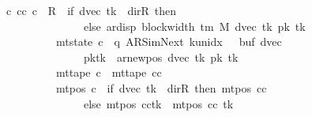 \begin{isabellebody}
\ \ \ \ \ \ \ \ \ \ \ {\isasymLongrightarrow}\ {\isasymexists}c{\isacharprime}{\kern0pt}{\isachardot}{\kern0pt}\ {\isacharparenleft}{\kern0pt}cc{\isacharcomma}{\kern0pt}\ c{\isacharprime}{\kern0pt}{\isacharparenright}{\kern0pt}\ {\isasymin}\ R{\isacharprime}{\kern0pt}\ {\isacharcircum}{\kern0pt}{\isacharcircum}{\kern0pt}\ {\isacharparenleft}{\kern0pt}if\ dvec\ tk{\isacharprime}{\kern0pt}\ {\isacharequal}{\kern0pt}\ dir{\isachardot}{\kern0pt}R\ then\ {}\isanewline
\ \ \ \ \ \ \ \ \ \ \ \ \ \ \ \ \ \ \ \ \ \ \ \ \ \ else\ ar{\isacharunderscore}{\kern0pt}disp\ {\isacharparenleft}{\kern0pt}block{\isacharunderscore}{\kern0pt}width\ {\isacharparenleft}{\kern0pt}{\isasymGamma}{\isacharunderscore}{\kern0pt}tm\ M{\isacharparenright}{\kern0pt}{\isacharparenright}{\kern0pt}\ {\isacharparenleft}{\kern0pt}dvec\ tk{\isacharprime}{\kern0pt}{\isacharparenright}{\kern0pt}\ {\isacharparenleft}{\kern0pt}pk{\isacharprime}{\kern0pt}\ tk{\isacharprime}{\kern0pt}{\isacharparenright}{\kern0pt}{\isacharparenright}{\kern0pt}\isanewline
\ \ \ \ \ \ \ \ \ \ \ \ \ \ \ \ \ \ \ \ {\isasymand}\ mt{\isacharunderscore}{\kern0pt}state\ c{\isacharprime}{\kern0pt}\ {\isacharequal}{\kern0pt}\ {\isacharparenleft}{\kern0pt}q{\isacharcomma}{\kern0pt}\ AR{\isacharunderscore}{\kern0pt}SimNext{\isacharcomma}{\kern0pt}\ k{\isacharunderscore}{\kern0pt}unidx\ {}{\isacharcomma}{\kern0pt}\ {}{\isacharcomma}{\kern0pt}\ buf{}{\isacharcomma}{\kern0pt}\ dvec{\isacharcomma}{\kern0pt}\isanewline
\ \ \ \ \ \ \ \ \ \ \ \ \ \ \ \ \ \ \ \ \ \ \ \ \ \ pk{\isacharprime}{\kern0pt}{\isacharparenleft}{\kern0pt}tk{\isacharprime}{\kern0pt}\ {\isacharcolon}{\kern0pt}{\isacharequal}{\kern0pt}\ ar{\isacharunderscore}{\kern0pt}newpos\ {\isacharparenleft}{\kern0pt}dvec\ tk{\isacharprime}{\kern0pt}{\isacharparenright}{\kern0pt}\ {\isacharparenleft}{\kern0pt}pk{\isacharprime}{\kern0pt}\ tk{\isacharprime}{\kern0pt}{\isacharparenright}{\kern0pt}{\isacharparenright}{\kern0pt}{\isacharparenright}{\kern0pt}\isanewline
\ \ \ \ \ \ \ \ \ \ \ \ \ \ \ \ \ \ \ \ {\isasymand}\ mt{\isacharunderscore}{\kern0pt}tape\ c{\isacharprime}{\kern0pt}\ {\isacharequal}{\kern0pt}\ mt{\isacharunderscore}{\kern0pt}tape\ cc\isanewline
\ \ \ \ \ \ \ \ \ \ \ \ \ \ \ \ \ \ \ \ {\isasymand}\ mt{\isacharunderscore}{\kern0pt}pos\ c{\isacharprime}{\kern0pt}\ {\isacharequal}{\kern0pt}\ {\isacharparenleft}{\kern0pt}if\ dvec\ tk{\isacharprime}{\kern0pt}\ {\isacharequal}{\kern0pt}\ dir{\isachardot}{\kern0pt}R\ then\ mt{\isacharunderscore}{\kern0pt}pos\ cc\isanewline
\ \ \ \ \ \ \ \ \ \ \ \ \ \ \ \ \ \ \ \ \ \ \ \ \ \ else\ {\isacharparenleft}{\kern0pt}mt{\isacharunderscore}{\kern0pt}pos\ cc{\isacharparenright}{\kern0pt}{\isacharparenleft}{\kern0pt}tk{\isacharprime}{\kern0pt}\ {\isacharcolon}{\kern0pt}{\isacharequal}{\kern0pt}\ mt{\isacharunderscore}{\kern0pt}pos\ cc\ tk{\isacharprime}{\kern0pt}\isanewline

\end{isabellebody}
